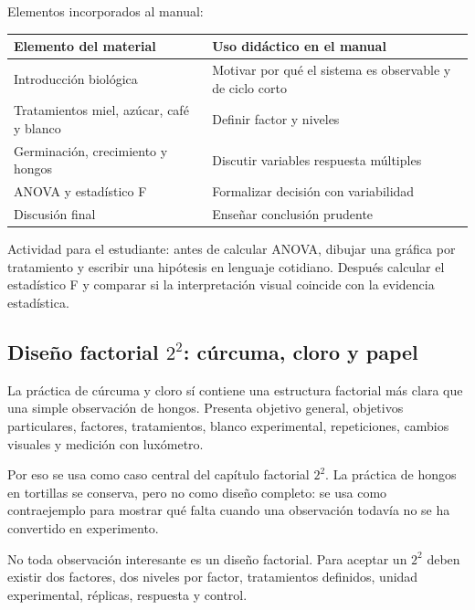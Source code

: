 Elementos incorporados al manual:

\begin{table}[H]
\centering
\begin{tabular}{p{}p{}}
\toprule
Elemento del material & Uso didáctico en el manual\\
\midrule
Introducción biológica & Motivar por qué el sistema es observable y de ciclo corto\\
Tratamientos miel, azúcar, café y blanco & Definir factor y niveles\\
Germinación, crecimiento y hongos & Discutir variables respuesta múltiples\\
ANOVA y estadístico F & Formalizar decisión con variabilidad\\
Discusión final & Enseñar conclusión prudente\\
\bottomrule
\end{tabular}
\end{table}

\begin{practica}
Actividad para el estudiante: antes de calcular ANOVA, dibujar una gráfica por tratamiento y escribir una hipótesis en lenguaje cotidiano. Después calcular el estadístico F y comparar si la interpretación visual coincide con la evidencia estadística.
\end{practica}

\subsection{Diseño factorial \(2^2\): cúrcuma, cloro y papel}

La práctica de cúrcuma y cloro sí contiene una estructura factorial más clara que una simple observación de hongos. Presenta objetivo general, objetivos particulares, factores, tratamientos, blanco experimental, repeticiones, cambios visuales y medición con luxómetro.

Por eso se usa como caso central del capítulo factorial \(2^2\). La práctica de hongos en tortillas se conserva, pero no como diseño completo: se usa como contraejemplo para mostrar qué falta cuando una observación todavía no se ha convertido en experimento.

\begin{cuidado}
No toda observación interesante es un diseño factorial. Para aceptar un \(2^2\) deben existir dos factores, dos niveles por factor, tratamientos definidos, unidad experimental, réplicas, respuesta y control.
\end{cuidado}

